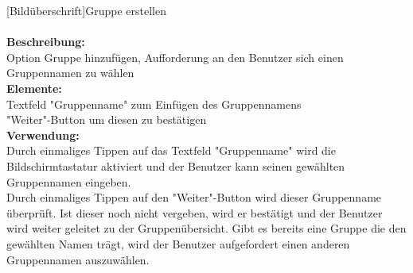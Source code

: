 [Bildüberschrift]Gruppe erstellen\\ \\
\textbf{Beschreibung:}\\
Option Gruppe hinzufügen, Aufforderung an den Benutzer sich einen Gruppennamen zu wählen\\
\textbf{Elemente:}\\
Textfeld "Gruppenname" zum Einfügen des Gruppennamens\\
"Weiter"-Button um diesen zu bestätigen\\
\textbf{Verwendung:}\\
Durch einmaliges Tippen auf das Textfeld "Gruppenname" wird die Bildschirmtastatur aktiviert und der Benutzer kann seinen gewählten Gruppennamen eingeben.\\
Durch einmaliges Tippen auf den "Weiter"-Button wird dieser Gruppenname überprüft. Ist dieser noch nicht vergeben, wird er bestätigt und der Benutzer wird weiter geleitet zu der Gruppenübersicht. Gibt es bereits eine Gruppe die den gewählten Namen trägt, wird der Benutzer aufgefordert einen anderen Gruppennamen auszuwählen.
\newpage

